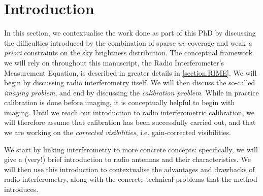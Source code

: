\chapter{Introduction}
\minitoc

\pg
In this section, we contextualise the work done as part of this PhD by discussing the difficulties introduced by the combination of sparse $uv$-coverage and weak \emph{a priori} constraints on the sky brightness distribution. The conceptual framework we will rely on throughout this manuscript, the Radio Interferometer's Measurement Equation, is described in greater details in  \cref{section.RIME}. We will begin by discussing radio interferometry itself. We will then discuss the so-called \emph{imaging problem}, and end by discussing the \emph{calibration problem}. While in practice calibration is done before imaging, it is conceptually helpful to begin with imaging. Until we reach our introduction to radio interferometric calibration, we will therefore assume that calibration has been successfully carried out, and that we are working on the \emph{corrected visibilities}, i.e. gain-corrected visibilities. 

\pg
We start by linking interferometry to more concrete concepts: specifically, we will give a (very!) brief introduction to radio antennas and their characteristics. We will then use this introduction to contextualise the advantages and drawbacks of radio interferometry, along with the concrete technical problems that the method introduces.


\clearpage

\clearpage

\clearpage

\clearpage
